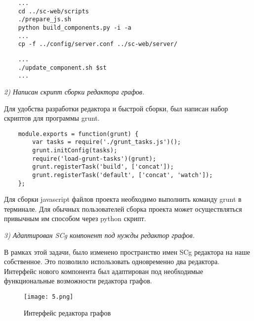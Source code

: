 \begin{listing}[H]
  \begin{verbatim}
    ...
    cd ../sc-web/scripts
    ./prepare_js.sh
    python build_components.py -i -a
    ...
    cp -f ../config/server.conf ../sc-web/server/
  \end{verbatim}
  \caption{Фрагмент файла prepare\_web.sh}
  \label{lst:practice:modelling_example}
\end{listing}

\begin{listing}[H]
  \begin{verbatim}
    ...
    ./update_component.sh $st
    ...
  \end{verbatim}
  \caption{Фрагмент файла prepare.sh}
  \label{lst:practice:modelling_example}
\end{listing}

{\itshape
2) Написан скрипт сборки редактора графов.}

Для удобства разработки редактора и быстрой сборки, был написан набор скриптов для программы grunt. 

\begin{listing}[H]
  \begin{verbatim}
    module.exports = function(grunt) {
        var tasks = require('./grunt_tasks.js')();
        grunt.initConfig(tasks);
        require('load-grunt-tasks')(grunt);
        grunt.registerTask('build', ['concat']);
        grunt.registerTask('default', ['concat', 'watch']);
    };
  \end{verbatim}
  \caption{Скрипт запуска сборки проекта }
  \label{lst:practice:modelling_example}
\end{listing}

Для сборки javascript файлов проекта необходимо выполнить команду grunt в терминале. Для обычных пользователей сборка проекта может осуществляться привычным им способом через python скрипт.

{\itshape
3) Адаптирован SCg компонент под нужды редактор графов.}

В рамках этой задачи, было изменено пространство имен SCg редактора на наше собственное. Это позволило использовать одновременно два редактора. Интерфейс нового компонента был адаптирован под необходимые функциональные возможности редактора графов. 

\begin{figure}[H]
  \centering
  \texttt{[image: 5.png]}
  \caption{Интерфейс редактора графов}
  \label{fig:hardware:sdr_pipeline}
\end{figure}

